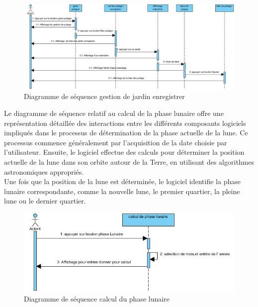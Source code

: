 	\begin{figure}[!h]
    	\center
    		\includegraphics[width=1\textwidth]{image/diagrame2/Gerer_potager2.jpg}
   		\caption{Diagramme de séquence gestion de jardin enregistrer}
    	\label{Diagramme de séquence gestion de jardin enregistrer}
	\end{figure}
	Le diagramme de séquence relatif au calcul de la phase lunaire offre une représentation détaillée des interactions entre les différents composants logiciels impliqués dans le processus de détermination de la phase actuelle de la lune. Ce processus commence généralement par l'acquisition de la date choisie par l'utilisateur. Ensuite, le logiciel effectue des calculs pour déterminer la position actuelle de la lune dans son orbite autour de la Terre, en utilisant des algorithmes astronomiques appropriés.\\
Une fois que la position de la lune est déterminée, le logiciel identifie la phase lunaire correspondante, comme la nouvelle lune, le premier quartier, la pleine lune ou le dernier quartier. \\
	\begin{figure}[!h]
    	\center
    		\includegraphics[width=1\textwidth]{image/diagrame2/calcul_phase_lunaire.jpg}
   		\caption{Diagramme de séquence calcul du phase lunaire}
    	\label{Diagramme de séquence calcul du phase lunaire}
	\end{figure}
